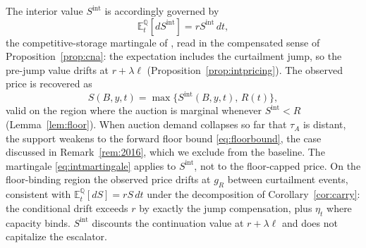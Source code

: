 \documentclass[11pt,letterpaper]{article}
\theoremstyle{plain}
\theoremstyle{definition}
\newcommand{\E}{\mathbb{E}}                  %
\newcommand{\Qmeasure}{\mathbb{Q}}           %
\numberwithin{equation}{section}
\begin{document}
The interior value $S^{\mathrm{int}}$ is accordingly governed by
\begin{equation}\label{eq:intmartingale}
\E_t^{\Qmeasure}[dS^{\mathrm{int}}] = rS^{\mathrm{int}}\,dt,
\end{equation}
the competitive-storage martingale of \citet{deaton1992,deaton1996}, read in the compensated sense of Proposition~\ref{prop:cna}: the expectation includes the curtailment jump, so the pre-jump value drifts at $r+\lambda\ell$ (Proposition~\ref{prop:intpricing}). The observed price is recovered as
\begin{equation}\label{eq:pricerecovery}
S(B,y,t) = \max\{S^{\mathrm{int}}(B,y,t),\, R(t)\},
\end{equation}
valid on the region where the auction is marginal whenever $S^{\mathrm{int}}<R$ (Lemma~\ref{lem:floor}). When auction demand collapses so far that $\tau_A$ is distant, the support weakens to the forward floor bound \eqref{eq:floorbound}, the case discussed in Remark~\ref{rem:2016}, which we exclude from the baseline. The martingale \eqref{eq:intmartingale} applies to $S^{\mathrm{int}}$, not to the floor-capped price. On the floor-binding region the observed price drifts at $g_R$ between curtailment events, consistent with $\E_t^\Qmeasure[dS]=rS\,dt$ under the decomposition of Corollary~\ref{cor:carry}: the conditional drift exceeds $r$ by exactly the jump compensation, plus $\eta_t$ where capacity binds. $S^{\mathrm{int}}$ discounts the continuation value at $r+\lambda\ell$ and does not capitalize the escalator.
\end{document}
